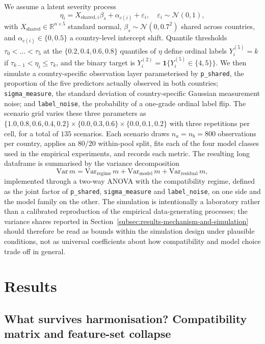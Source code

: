 \documentclass[11pt,a4paper]{article}
\newcommand{\Y}{\ensuremath{Y}}
\begin{document}
We assume a latent severity process
\[
\eta_i = X_{\text{shared},i} \beta_s + \alpha_{c(i)} + \varepsilon_i,
\quad \varepsilon_i \sim \mathcal{N}(0, 1),
\]
with $X_{\text{shared}} \in \mathbb{R}^{n \times 5}$ standard normal, $\beta_s \sim \mathcal{N}(0, 0.7^2)$ shared across countries, and $\alpha_{c(i)} \in \{0, 0.5\}$ a country-level intercept shift. Quantile thresholds $\tau_0 < \dots < \tau_5$ at the $\{0.2, 0.4, 0.6, 0.8\}$ quantiles of $\eta$ define ordinal labels $\Y^{(5)}_i = k$ if $\tau_{k-1} < \eta_i \le \tau_k$, and the binary target is $\Y^{(2)}_i = \mathbf{1}\{\Y^{(5)}_i \in \{4,5\}\}$. We then simulate a country-specific observation layer parameterised by \texttt{p\_shared}, the proportion of the five predictors actually observed in both countries; \texttt{sigma\_measure}, the standard deviation of country-specific Gaussian measurement noise; and \texttt{label\_noise}, the probability of a one-grade ordinal label flip. The scenario grid varies these three parameters as $\{1.0, 0.8, 0.6, 0.4, 0.2\} \times \{0.0, 0.3, 0.6\} \times \{0.0, 0.1, 0.2\}$ with three repetitions per cell, for a total of $135$ scenarios. Each scenario draws $n_a = n_b = 800$ observations per country, applies an 80/20 within-pool split, fits each of the four model classes used in the empirical experiments, and records each metric. The resulting long dataframe is summarised by the variance decomposition
\[
\mathrm{Var}\,m = \mathrm{Var}_{\text{regime}}\,m
+ \mathrm{Var}_{\text{model}}\,m + \mathrm{Var}_{\text{residual}}\,m,
\]
implemented through a two-way ANOVA with the compatibility regime, defined as the joint factor of \texttt{p\_shared}, \texttt{sigma\_measure} and \texttt{label\_noise}, on one side and the model family on the other. The simulation is intentionally a laboratory rather than a calibrated reproduction of the empirical data-generating processes; the variance shares reported in Section~\ref{subsec:results-mechanism-and-simulation} should therefore be read as bounds within the simulation design under plausible conditions, not as universal coefficients about how compatibility and model choice trade off in general.

\section{Results}
\label{sec:results}

\subsection{What survives harmonisation? Compatibility matrix and feature-set collapse}
\label{subsec:results-compatibility}
\end{document}
